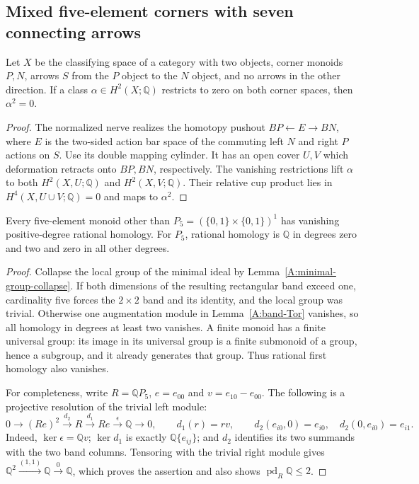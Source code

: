 \subsection{Mixed five-element corners with seven connecting arrows}

\begin{lemma}
\label{CP2:A-collage-relative-cup}
Let $X$ be the classifying space of a category with two objects,
corner monoids $P,N$, arrows $S$ from the $P$ object to the $N$
object, and no arrows in the other direction. If a class
$\alpha\in H^2(X;\mathbb Q)$ restricts to zero on both corner
spaces, then $\alpha^2=0$.
\end{lemma}
\begin{proof}
The normalized nerve realizes the homotopy pushout
$BP\leftarrow E\to BN$, where $E$ is the two-sided action bar
space of the commuting left $N$ and right $P$ actions on $S$.
Use its double mapping cylinder. It has an open cover $U,V$
which deformation retracts onto $BP,BN$, respectively. The
vanishing restrictions lift $\alpha$ to both $H^2(X,U;\mathbb Q)$
and $H^2(X,V;\mathbb Q)$. Their relative cup product lies in
$H^4(X,U\cup V;\mathbb Q)=0$ and maps to $\alpha^2$.
\end{proof}

\begin{lemma}
\label{CP2:A-order-five-corner}
Every five-element monoid other than
$P_5=(\{0,1\}\times\{0,1\})^1$ has vanishing positive-degree
rational homology. For $P_5$, rational homology is $\mathbb Q$
in degrees zero and two and zero in all other degrees.
\end{lemma}
\begin{proof}
Collapse the local group of the minimal ideal by
Lemma~\ref{A:minimal-group-collapse}. If both dimensions
of the resulting rectangular band exceed one, cardinality
five forces the $2\times2$ band and its identity, and the local
group was trivial. Otherwise one augmentation module in
Lemma~\ref{A:band-Tor} vanishes, so all homology in degrees
at least two vanishes. A finite monoid has a finite universal
group: its image in its universal group is a finite submonoid
of a group, hence a subgroup, and it already generates that
group. Thus rational first homology also vanishes.

For completeness, write $R=\mathbb QP_5$, $e=e_{00}$ and
$v=e_{10}-e_{00}$. The following is a projective resolution of
the trivial left module:
\[
0\longrightarrow (Re)^2\xrightarrow{d_2}R
\xrightarrow{d_1}Re\xrightarrow{\epsilon}\mathbb Q
\longrightarrow0,
\qquad d_1(r)=rv,
\qquad d_2(e_{i0},0)=e_{i0},\quad
 d_2(0,e_{i0})=e_{i1}.
\]
Indeed, $\ker\epsilon=\mathbb Qv$; $\ker d_1$ is exactly
$\mathbb Q\{e_{ij}\}$; and $d_2$ identifies its two summands
with the two band columns. Tensoring with the trivial right
module gives $\mathbb Q^2\xrightarrow{(1,1)}\mathbb Q
\xrightarrow{0}\mathbb Q$, which proves the assertion and
also shows $\operatorname{pd}_R\mathbb Q\le2$.
\end{proof}

